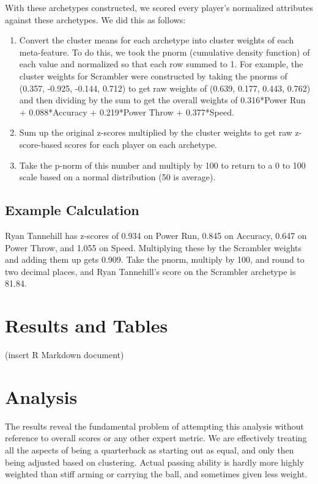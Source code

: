 \documentclass[12pt]{article}
\begin{document}
With these archetypes constructed, we scored every player's normalized attributes against these archetypes. We did this as follows:

\begin{enumerate}
	\item Convert the cluster means for each archetype into cluster weights of each meta-feature. To do this, we took the pnorm (cumulative density function) of each value and normalized so that each row summed to 1. For example, the cluster weights for Scrambler were constructed by taking the pnorms of (0.357, -0.925, -0.144, 0.712) to get raw weights of (0.639, 0.177, 0.443, 0.762) and then dividing by the sum to get the overall weights of 0.316*Power Run + 0.088*Accuracy + 0.219*Power Throw + 0.377*Speed.
	\item Sum up the original z-scores multiplied by the cluster weights to get raw z-score-based scores for each player on each archetype. 
	\item Take the p-norm of this number and multiply by 100 to return to a 0 to 100 scale based on a normal distribution (50 is average).
\end{enumerate}

\subsection{Example Calculation}

Ryan Tannehill has z-scores of 0.934 on Power Run, 0.845 on Accuracy, 0.647 on Power Throw, and 1.055 on Speed. Multiplying these by the Scrambler weights and adding them up gets 0.909. Take the pnorm, multiply by 100, and round to two decimal places, and Ryan Tannehill's score on the Scrambler archetype is 81.84.

\section{Results and Tables}

(insert R Markdown document)

\section{Analysis}

The results reveal the fundamental problem of attempting this analysis without reference to overall scores or any other expert metric. We are effectively treating all the aspects of being a quarterback as starting out as equal, and only then being adjusted based on clustering. Actual passing ability is hardly more highly weighted than stiff arming or carrying the ball, and sometimes given less weight. 
\end{document}
